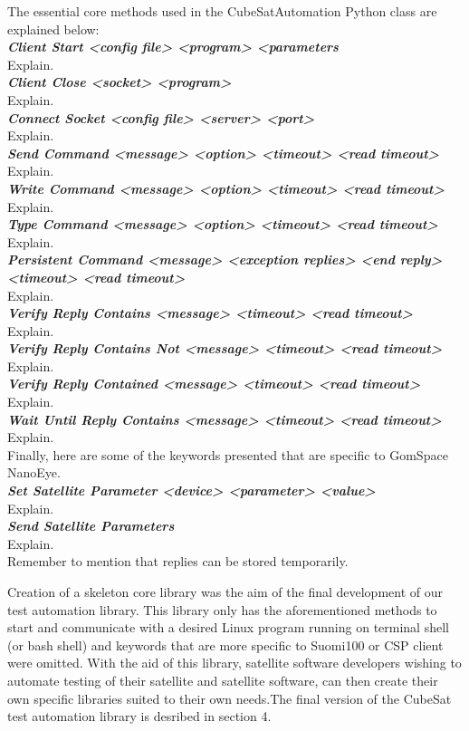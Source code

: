 \documentclass[english,12pt,a4paper,pdftex,elec,utf8]{aaltothesis}
\begin{document}
The essential core methods used in the CubeSatAutomation Python class are explained below:\\
\textit{\textbf{Client Start  <config file> <program> <parameters}}\\
Explain.\\
\textit{\textbf{Client Close <socket> <program>}}\\
Explain.\\
\textit{\textbf{Connect Socket <config file> <server> <port>}}\\
Explain.\\
\textit{\textbf{Send Command  <message> <option> <timeout> <read timeout>}}\\
Explain.\\
\textit{\textbf{Write Command  <message> <option> <timeout> <read timeout>}}\\
Explain.\\
\textit{\textbf{Type Command  <message> <option> <timeout> <read timeout>}}\\
Explain.\\
\textit{\textbf{Persistent Command  <message> <exception replies> <end reply> <timeout> <read timeout>}}\\
Explain.\\
\textit{\textbf{Verify Reply Contains  <message> <timeout> <read timeout>}}\\
Explain.\\
\textit{\textbf{Verify Reply Contains Not  <message> <timeout> <read timeout>}}\\
Explain.\\
\textit{\textbf{Verify Reply Contained  <message> <timeout> <read timeout>}}\\
Explain.\\
\textit{\textbf{Wait Until Reply Contains  <message> <timeout> <read timeout>}}\\
Explain.\\
Finally, here are some of the keywords presented that are specific to GomSpace NanoEye.\\
\textit{\textbf{Set Satellite Parameter  <device> <parameter> <value>}}\\
Explain.\\
\textit{\textbf{Send Satellite Parameters}}\\
Explain.\\
Remember to mention that replies can be stored temporarily.\par
Creation of a skeleton core library was the aim of the final development of our test automation library. This library only has the aforementioned methods to start and communicate with a desired Linux program running on terminal shell (or bash shell) and keywords that are more specific to Suomi100 or CSP client were omitted. With the aid of this library, satellite software developers wishing to automate testing of their satellite and satellite software, can then create their own specific libraries suited to their own needs.The final version of the CubeSat test automation library is desribed in section 4.\\
\end{document}

